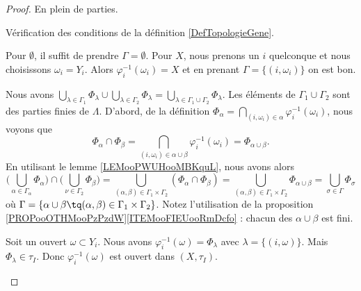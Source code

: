 \begin{proof}
	En plein de parties.
	\begin{subproof}
		Vérification des conditions de la définition \ref{DefTopologieGene}.
		\begin{subproof}
			Pour \( \emptyset\), il suffit de prendre \( \Gamma=\emptyset\). Pour \( X\), nous prenons un \( i\) quelconque et nous choisissons \( \omega_i=Y_i\). Alors \( \varphi_i^{-1}(\omega_i)=X\) et en prenant \( \Gamma=\{ (i,\omega_i) \} \) on est bon.

			Nous avons \( \bigcup_{\lambda\in \Gamma_1}\Phi_{\lambda}\cup\bigcup_{\lambda\in\Gamma_2}\Phi_{\lambda}=\bigcup_{\lambda\in \Gamma_1\cup\Gamma_2}\Phi_{\lambda}\). Les éléments de \( \Gamma_1\cup\Gamma_2\) sont des parties finies de \( \Lambda\).
			D'abord, de la définition \( \Phi_{\alpha}=\bigcap_{(i,\omega_i)\in \alpha}\varphi_{i}^{-1}(\omega_i)\), nous voyons que
			\begin{equation}
				\Phi_{\alpha}\cap\Phi_{\beta}=\bigcap_{(i,\omega_i)\in \alpha\cup\beta}\varphi_i^{-1}(\omega_i)=\Phi_{\alpha\cup \beta}.
			\end{equation}
			En utilisant le lemme \ref{LEMooPWUHooMBKquL}, nous avons alors
			\begin{equation}
				\big(  \bigcup_{\alpha\in \Gamma_{\alpha}}\Phi_{\alpha} \big)\cap\big(  \bigcup_{\nu\in\Gamma_2}\Phi_{\beta}  \big)=\bigcup_{(\alpha,\beta)\in \Gamma_1\times \Gamma_2}(\Phi_{\alpha}\cap\Phi_{\beta})=\bigcup_{(\alpha,\beta)\in\Gamma_1\times \Gamma_2}\Phi_{\alpha\cup\beta}=\bigcup_{\sigma\in\Gamma}\Phi_{\sigma}
			\end{equation}
			où \( \Gamma=\{ \alpha\cup\beta\tq (\alpha,\beta)\in\Gamma_1\times \Gamma_2 \}\). Notez l'utilisation de la proposition \ref{PROPooOTHMooPzPzdW}\ref{ITEMooFIEUooRmDcfo} : chacun des \( \alpha\cup\beta\) est fini.
		\end{subproof}

		Soit un ouvert \( \omega\subset Y_i\). Nous avons \( \varphi_i^{-1}(\omega)=\Phi_{\lambda}\) avec \( \lambda=\{ (i,\omega) \}\). Mais \( \Phi_{\lambda}\in\tau_I\). Donc \( \varphi_i^{-1}(\omega)\) est ouvert dans \( (X,\tau_I)\).


\end{subproof}
\end{proof}

